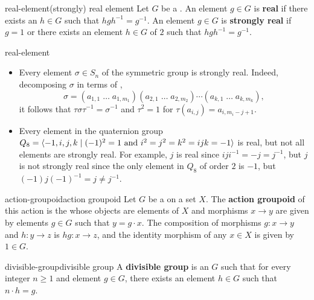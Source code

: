 \begin{topic}{real-element}{(strongly) real element}
    Let $G$ be a . An element $g \in G$ is \textbf{real} if there exists an $h \in G$ such that $h g h^{-1} = g^{-1}$. An element $g \in G$ is \textbf{strongly real} if $g = 1$ or there exists an element $h \in G$ of  $2$ such that $h g h^{-1} = g^{-1}$.
\end{topic}

\begin{example}{real-element}
    \begin{itemize}
        \item Every element $\sigma \in S_n$ of the symmetric group is strongly real. Indeed, decomposing $\sigma$ in terms of ,
        \[ \sigma = (a_{1, 1} \; \ldots \; a_{1, m_1}) (a_{2, 1} \; \ldots \; a_{2, m_2}) \cdots (a_{k, 1} \; \ldots \; a_{k, m_k}) , \]
        it follows that $\tau \sigma \tau^{-1} = \sigma^{-1}$ and $\tau^2 = 1$ for $\tau(a_{i, j}) = a_{i, m_i - j + 1}$.
        \item Every element in the quaternion group $Q_8 = \langle -1, i, j, k \mid (-1)^2 = 1 \textup{ and } i^2 = j^2 = k^2 = ijk = -1 \rangle$ is real, but not all elements are strongly real. For example, $j$ is real since $i j i^{-1} = -j = j^{-1}$, but $j$ is not strongly real since the only element in $Q_8$ of order $2$ is $-1$, but $(-1) j (-1)^{-1} = j \ne j^{-1}$.
    \end{itemize}
\end{example}

\begin{topic}{action-groupoid}{action groupoid}
    Let $G$ be a   on a set $X$. The \textbf{action groupoid} of this action is the  whose objects are elements of $X$ and morphisms $x \to y$ are given by elements $g \in G$ such that $y = g \cdot x$. The composition of morphisms $g : x \to y$ and $h : y \to z$ is $hg : x \to z$, and the identity morphism of any $x \in X$ is given by $1 \in G$.
\end{topic}

\begin{topic}{divisible-group}{divisible group}
    A \textbf{divisible group} is an  $G$ such that for every integer $n \ge 1$ and element $g \in G$, there exists an element $h \in G$ such that $n \cdot h = g$.
\end{topic}


